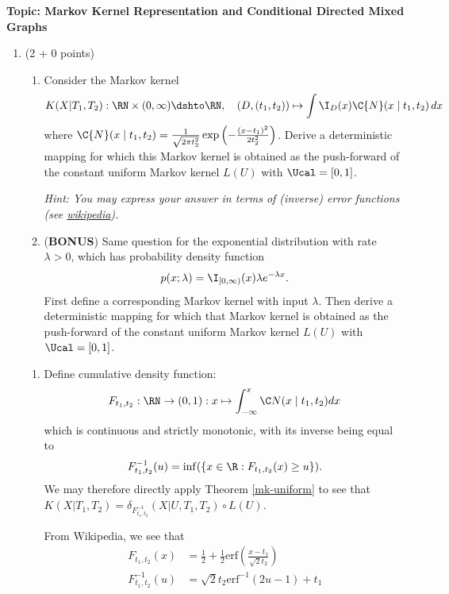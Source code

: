 

\flushleft\textbf{Topic: Markov Kernel Representation and Conditional Directed Mixed Graphs}
\begin{enumerate}
\item (2 + 0 points) 
\begin{enumerate}
  \item
  Consider the Markov kernel 
  $$K(X|T_1,T_2) : \RN\times(0,\infty) \dshto \RN,\quad (D,(t_1,t_2)) \mapsto \int \I_D(x) \C{N}(x \mid t_1,t_2) \,dx$$
  where $\C{N}(x \mid t_1,t_2) = \frac{1}{\sqrt{2\pi t_2^2}} \exp\left(-\frac{(x-t_1)^2}{2 t_2^2}\right)$.
  Derive a deterministic mapping for which this Markov kernel is obtained as the push-forward of the constant uniform Markov kernel $L(U)$ with $\Ucal = [0,1]$.

  \emph{Hint: You may express your answer in terms of (inverse) error functions (see \href{https://en.wikipedia.org/wiki/Error_function}{wikipedia}).}

  \item (\textbf{BONUS}) Same question for the exponential distribution with rate $\lambda > 0$, which has probability density function 
  $$p(x;\lambda) = \I_{[0,\infty)}(x) \lambda e^{-\lambda x}.$$
  First define a corresponding Markov kernel with input $\lambda$. Then derive a deterministic mapping for which that Markov kernel is obtained as the push-forward of the constant uniform Markov kernel $L(U)$ with $\Ucal = [0,1]$.
\end{enumerate}
\begin{gradedsolution}
  \begin{enumerate}
  \item
  Define cumulative density function:
  \[
  F_{t_1,t_2} : \RN \to (0, 1) : x \mapsto \int_{-\infty}^x \C N(x \mid t_1, t_2)dx
  \]
  which is continuous and strictly monotonic, with its inverse being equal to
  $$F^{-1}_{t_1, t_2}(u) = \inf(\{x\in \R : F_{t_1,t_2}(x) \geq u\}).$$
  We may therefore directly apply Theorem \ref*{mk-uniform} to see that $K(X|T_1, T_2) = \delta_{F^{-1}_{t_1, t_2}}(X|U, T_1, T_2) \circ L(U)$.

  From Wikipedia, we see that
  \begin{align*}
    F_{t_1, t_2}(x)&=\frac{1}{2}+ \frac{1}{2}\text{erf}(\frac{x-t_1}{\sqrt{2}t_2})\\
    F^{-1}_{t_1, t_2}(u)&=\sqrt{2}t_2 \text{erf}^{-1}(2u-1)+t_1
  \end{align*}
  

\end{enumerate}
\end{gradedsolution}
\end{enumerate}
